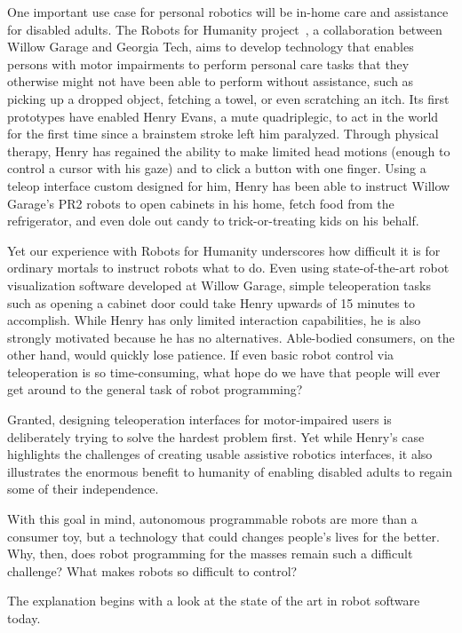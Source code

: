\documentclass[11pt,twocolumn]{article}
\begin{document}
One important use case for personal robotics will be in-home care and assistance for disabled adults. The Robots for Humanity project~\cite{rfh}, a collaboration between Willow Garage and Georgia Tech, aims to develop technology that enables persons with motor impairments to perform personal care tasks that they otherwise might not have been able to perform without assistance, such as picking up a dropped object, fetching a towel, or even scratching an itch. Its first prototypes have enabled Henry Evans, a mute quadriplegic, to act in the world for the first time since a brainstem stroke left him paralyzed. Through physical therapy, Henry has regained the ability to make limited head motions (enough to control a cursor with his gaze) and to click a button with one finger.  Using a teleop interface custom designed for him, Henry has been able to instruct Willow Garage's PR2 robots to open cabinets in his home, fetch food from the refrigerator, and even dole out candy to trick-or-treating kids on his behalf.


Yet our experience with Robots for Humanity underscores how difficult it is for ordinary mortals to instruct robots what to do. Even using state-of-the-art robot visualization software developed at Willow Garage, simple teleoperation tasks such as opening a cabinet door could take Henry upwards of 15 minutes to accomplish.  While Henry has only limited interaction capabilities, he is also strongly motivated because he has no alternatives. Able-bodied consumers, on the other hand, would quickly lose patience. If even basic robot control via teleoperation is so time-consuming, what hope do we have that people will ever get around to the general task of robot programming?

Granted, designing teleoperation interfaces for motor-impaired users is deliberately trying to solve the hardest problem first.  Yet while Henry's case highlights the challenges of creating usable assistive robotics interfaces, it also illustrates the enormous benefit to humanity of enabling disabled adults to regain some of their independence.

With this goal in mind, autonomous programmable robots are more than a consumer toy, but a technology that could changes people's lives for the better. Why, then, does robot programming for the masses remain such a difficult challenge? What makes robots so difficult to control?

The explanation begins with a look at the state of the art in robot software today.
\end{document}
